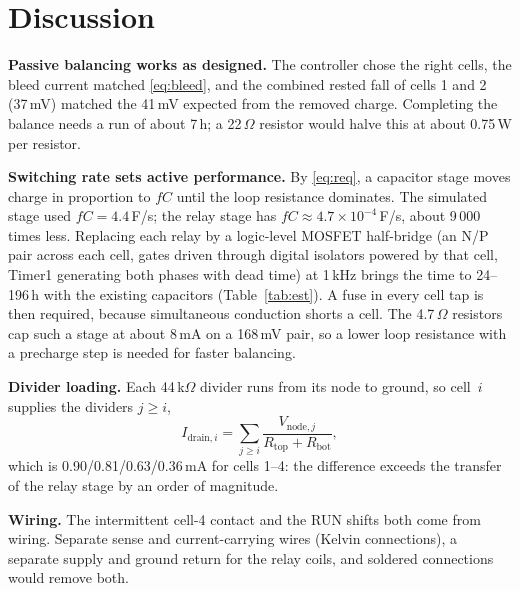 \documentclass[conference]{IEEEtran}
\begin{document}
\section{Discussion}
\label{sec:disc}
\textbf{Passive balancing works as designed.} The controller chose the right cells, the bleed current matched
\eqref{eq:bleed}, and the combined rested fall of cells 1 and 2 (37\,mV) matched the 41\,mV expected from the
removed charge. Completing the balance needs a
run of about 7\,h; a 22\,$\Omega$ resistor would halve this at about 0.75\,W per resistor.

\textbf{Switching rate sets active performance.} By \eqref{eq:req}, a capacitor stage moves charge in proportion
to $fC$ until the loop resistance dominates. The simulated stage used $fC=4.4$\,F/s; the relay stage has
$fC\approx4.7\times10^{-4}$\,F/s, about 9\,000 times less. Replacing each relay by a logic-level MOSFET half-bridge
(an N/P pair across each cell, gates driven through digital isolators powered by that cell, Timer1 generating both
phases with dead time) at 1\,kHz brings the time to 24--196\,h with the existing capacitors (Table~\ref{tab:est}).
A fuse in every cell tap is then required, because simultaneous conduction shorts a cell. The 4.7\,$\Omega$
resistors cap such a stage at about 8\,mA on a 168\,mV pair, so a lower loop resistance with a precharge step is
needed for faster balancing.

\textbf{Divider loading.} Each 44\,k$\Omega$ divider runs from its node to ground, so cell~$i$ supplies the
dividers $j\ge i$,
\begin{equation}
I_{\text{drain},i}=\sum_{j\ge i}\frac{V_{\text{node},j}}{R_\text{top}+R_\text{bot}},
\label{eq:drain}
\end{equation}
which is 0.90/0.81/0.63/0.36\,mA for cells 1--4: the difference exceeds the transfer of the relay stage by an
order of magnitude.

\textbf{Wiring.} The intermittent cell-4 contact and the RUN shifts both come from wiring. Separate sense and
current-carrying wires (Kelvin connections), a separate supply and ground return for the relay coils, and
soldered connections would remove both.
\end{document}
